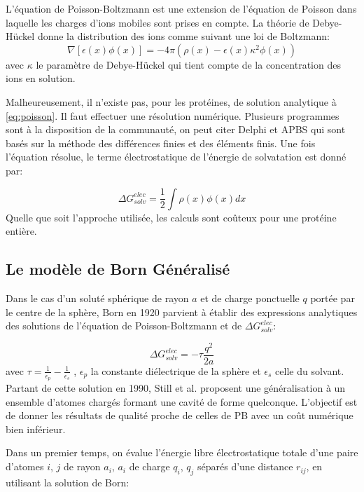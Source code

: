L'équation de Poisson-Boltzmann est une extension de l'équation de Poisson dans laquelle les charges d'ions mobiles sont prises en compte. La théorie de Debye-Hückel donne la distribution des ions comme suivant une loi de Boltzmann:
\begin{equation}
  \nabla [ \epsilon (x) \phi(x)] = -4 \pi ( \rho(x) - \epsilon(x) \kappa^2 \phi(x))
\end{equation}
avec $ \kappa $ le paramètre de Debye-Hückel qui tient compte de la concentration des ions en solution.

Malheureusement, il n'existe pas, pour les protéines, de solution analytique à \ref{eq:poisson}. Il faut effectuer une résolution numérique. Plusieurs programmes sont à la disposition de la communauté, on peut citer Delphi \cite{Rocchia02} et APBS \cite{Baker01}  qui sont basés sur la méthode des différences finies et des éléments finis. Une fois l'équation résolue, le terme électrostatique de l'énergie de solvatation est donné par:

\begin{equation}
\Delta G_{solv}^{elec} = \frac{1}{2} \int \rho(x)\phi(x)dx  
\end{equation}
Quelle que soit l'approche utilisée, les calculs sont coûteux pour une protéine entière.


\subsection{Le modèle de Born Généralisé}
\label{sub:GB}
Dans le cas d'un soluté sphérique de rayon $a$ et de charge ponctuelle $q$ portée par le centre de la sphère, Born en 1920 \cite{Born20} parvient à établir des expressions analytiques des solutions de l'équation de Poisson-Boltzmann et de $ \Delta G_{solv}^{elec}$:


\begin{equation}
  \label{eq:Born}
  \Delta G_{solv}^{elec} = - \tau \frac{q^2}{2a}
\end{equation}
avec $ \tau = \frac{1}{\epsilon_p} - \frac{1}{\epsilon_s}$ , $\epsilon_p$ la constante diélectrique de la sphère et $\epsilon_s$ celle du solvant. Partant de cette solution en 1990, Still et al. \cite{Still90} proposent une généralisation à un ensemble d'atomes chargés formant une cavité de forme quelconque. L'objectif est de donner les résultats de qualité proche de celles de PB avec un coût numérique bien inférieur.

Dans un premier temps, on évalue l'énergie libre électrostatique totale d'une paire d'atomes $i$, $j$ de rayon $a_i$, $a_i$ de charge $q_i$, $q_j$ séparés d'une distance $r_{ij}$, en utilisant la solution de Born:


